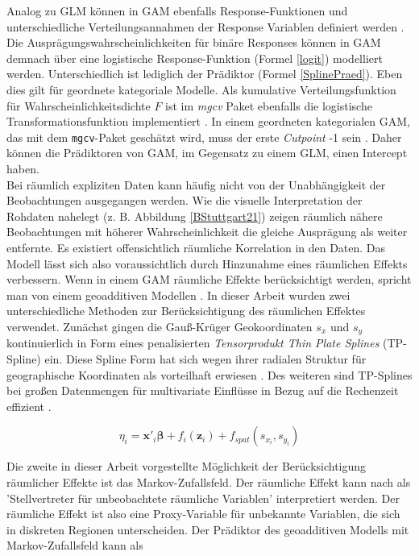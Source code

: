\documentclass{Vorlage}
\begin{document}
Analog zu GLM können in GAM ebenfalls Response-Funktionen und unterschiedliche Verteilungsannahmen der Response Variablen definiert werden \cite[p. 448]{fahrmeir2013regression}. Die Ausprägungswahrscheinlichkeiten für binäre Responses können in GAM demnach über eine logistische Response-Funktion (Formel \ref{logit}) modelliert werden. Unterschiedlich ist lediglich der Prädiktor (Formel \ref{SplinePraed}). Eben dies gilt für geordnete kategoriale Modelle. Als kumulative Verteilungsfunktion für Wahrscheinlichkeitsdichte $F$ ist im \textit{mgcv} Paket ebenfalls die logistische Transformationsfunktion implementiert \cite[p. 22]{wood2016}. In einem geordneten kategorialen GAM, das mit dem \texttt{mgcv}-Paket geschätzt wird, muss der erste \textit{Cutpoint} -1 sein \cite[p. 22]{wood2016}. Daher können die Prädiktoren von GAM, im Gegensatz zu einem GLM, einen Intercept haben.\\
Bei räumlich expliziten Daten kann häufig nicht von der Unabhängigkeit der Beobachtungen ausgegangen werden. Wie die visuelle Interpretation der Rohdaten nahelegt (z. B. Abbildung \ref{BStuttgart21}) zeigen räumlich nähere Beobachtungen mit höherer Wahrscheinlichkeit die gleiche Ausprägung als weiter entfernte. Es existiert offensichtlich räumliche Korrelation in den Daten. Das Modell lässt sich also voraussichtlich durch Hinzunahme eines räumlichen Effekts verbessern. Wenn in einem GAM räumliche Effekte berücksichtigt werden, spricht man von einem geoadditiven Modellen \cite[p. 540]{fahrmeir2013regression}. In dieser Arbeit wurden zwei unterschiedliche Methoden zur Berücksichtigung des räumlichen Effektes verwendet. Zunächst gingen die Gauß-Krüger Geokoordinaten $s_x$ und $s_y$ kontinuierlich in Form eines penalisierten \textit{Tensorprodukt Thin Plate Splines} (TP-Spline) ein. Diese Spline Form hat sich wegen ihrer radialen Struktur für geographische Koordinaten als vorteilhaft erwiesen \cite[p. 354]{gu1993}. Des weiteren sind TP-Splines bei großen Datenmengen für multivariate Einflüsse in Bezug auf die Rechenzeit effizient \cite[p. 95 f.]{wood2003}.

\begin{equation}
\eta_{i} =\mathbf{x}'_i \boldsymbol{\beta}+f_{i}(\mathbf{z}_{i})+f_{spat}(s_{x_i},s_{y_i})
\end{equation}

Die zweite in dieser Arbeit vorgestellte Möglichkeit der Berücksichtigung räumlicher Effekte ist das Markov-Zufallsfeld. Der räumliche Effekt kann nach \cite[p. 541]{fahrmeir2013regression} als 'Stellvertreter für unbeobachtete räumliche Variablen' interpretiert werden. Der räumliche Effekt ist also eine Proxy-Variable für unbekannte Variablen, die sich in diskreten Regionen unterscheiden. Der Prädiktor des geoadditiven Modells mit Markov-Zufallsfeld kann als
\end{document}

